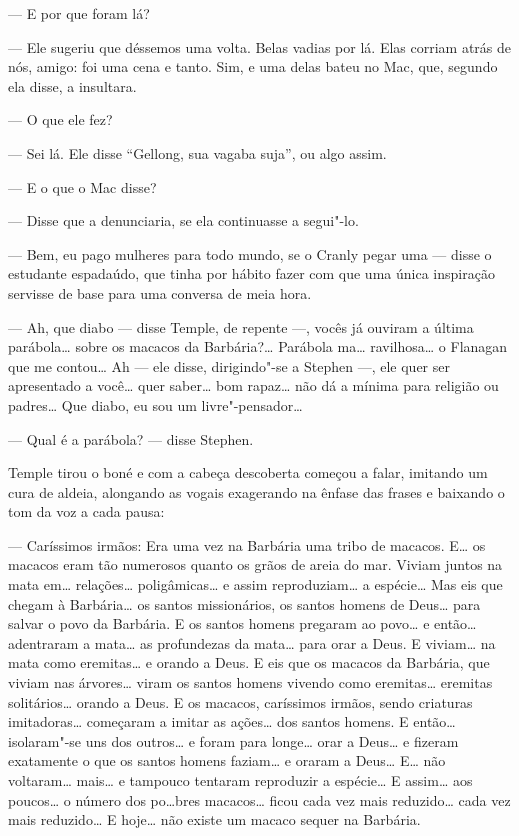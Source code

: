 --- E por que foram lá?

--- Ele sugeriu que déssemos uma volta.  Belas vadias por lá. 
Elas corriam atrás de nós, amigo: foi uma cena e tanto.  Sim, e uma
delas bateu no Mac, que, segundo ela disse, a insultara.

--- O que ele fez?

--- Sei lá.  Ele disse “Gellong, sua vagaba suja”,
ou algo assim.

--- E o que o Mac disse?

--- Disse que a denunciaria, se ela continuasse a segui"-lo.

--- Bem, eu pago mulheres para todo mundo, se o Cranly pegar uma
--- disse o estudante espadaúdo, que tinha por \label{habito"-fazer} hábito fazer com que uma
única inspiração servisse de base para uma conversa de meia hora.

--- Ah, que diabo --- disse Temple, de repente ---, vocês já
ouviram a última parábola\ldots{} sobre os macacos da Barbária?\ldots{}  Parábola
ma\ldots{} ravilhosa\ldots{} o Flanagan que me contou\ldots{} Ah --- ele disse,
dirigindo"-se a Stephen ---, ele quer ser apresentado a você\ldots{} quer
saber\ldots{} bom rapaz\ldots{} não dá a mínima para religião ou padres\ldots{}  Que
diabo, eu sou um livre"-pensador\ldots{}

--- Qual é a parábola? --- disse Stephen.

Temple tirou o boné e com a cabeça descoberta começou a falar,
imitando um cura de aldeia, alongando as vogais exagerando na
ênfase das frases e baixando o tom da voz a cada pausa:

--- Caríssimos irmãos: Era uma vez na Barbária uma tribo de
macacos.  E\ldots{} os macacos eram tão numerosos quanto os grãos de areia
do mar.  Viviam juntos na mata em\ldots{} relações\ldots{} poligâmicas\ldots{} e assim
reproduziam\ldots{} a espécie\ldots{}  Mas eis que chegam à Barbária\ldots{} os santos
missionários, os santos homens de Deus\ldots{} para salvar o povo da
Barbária.  E os santos homens pregaram ao povo\ldots{} e então\ldots{} adentraram
a mata\ldots{} as profundezas da mata\ldots{} para orar a Deus.  E viviam\ldots{} na
mata como eremitas\ldots{} e orando a Deus.  E eis que os macacos da
Barbária, que viviam nas árvores\ldots{} viram os santos homens vivendo como
eremitas\ldots{} eremitas solitários\ldots{} orando a Deus.  E os macacos,
caríssimos irmãos, sendo criaturas imitadoras\ldots{} começaram a imitar as
ações\ldots{} dos santos homens.  E então\ldots{} isolaram"-se
uns dos outros\ldots{} e foram para longe\ldots{} orar a Deus\ldots{} e
fizeram exatamente o que os santos homens faziam\ldots{} e oraram a Deus\ldots{} 
E\ldots{} não voltaram\ldots{} mais\ldots{} e tampouco tentaram reproduzir a
espécie\ldots{}  E assim\ldots{} aos poucos\ldots{} o número dos po\ldots{}bres macacos\ldots{}
ficou cada vez mais reduzido\ldots{} cada vez mais reduzido\ldots{}  E hoje\ldots{}
não existe um macaco sequer na Barbária.

